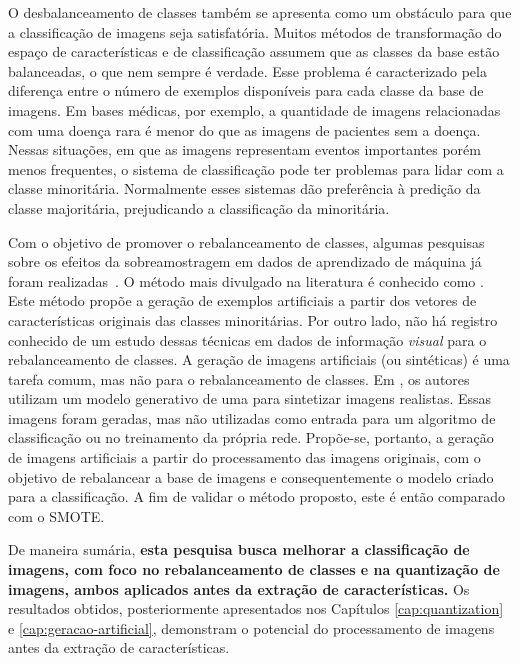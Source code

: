 O desbalanceamento de classes também se apresenta como um obstáculo para que a classificação de imagens seja satisfatória. Muitos métodos de transformação do espaço de características e de classificação assumem que as classes da base estão balanceadas, o que nem sempre é verdade. Esse problema é caracterizado pela diferença entre o número de exemplos disponíveis para cada classe da base de imagens. Em bases médicas, por exemplo, a quantidade de imagens relacionadas com uma doença rara é menor do que as imagens de pacientes sem a doença. Nessas situações, em que as imagens representam eventos importantes porém menos frequentes, o sistema de classificação pode ter problemas para lidar com a classe minoritária. Normalmente esses sistemas dão preferência à predição da classe majoritária, prejudicando a classificação da minoritária.

Com o objetivo de promover o rebalanceamento de classes, algumas pesquisas sobre os efeitos da sobreamostragem em dados de aprendizado de máquina já foram realizadas~\cite{Kuncheva2004,Chawla2002}. O método mais divulgado na literatura é conhecido como . Este método propõe a geração de exemplos artificiais a partir dos vetores de características originais das classes minoritárias. Por outro lado, não há registro conhecido de um estudo dessas técnicas em dados de informação \emph{visual} para o rebalanceamento de classes. A geração de imagens artificiais (ou sintéticas) é uma tarefa comum, mas não para o rebalanceamento de classes. Em , os autores utilizam um modelo generativo de uma  para sintetizar imagens realistas. Essas imagens foram geradas, mas não utilizadas como entrada para um algoritmo de classificação ou no treinamento da própria rede. Propõe-se, portanto, a geração de imagens artificiais a partir do processamento das imagens originais, com o objetivo de rebalancear a base de imagens e consequentemente o modelo criado para a classificação. A fim de validar o método proposto, este é então comparado com o SMOTE.

De maneira sumária, \textbf{esta pesquisa busca melhorar a classificação de imagens, com foco no rebalanceamento de classes e na quantização de imagens, ambos aplicados antes da extração de características.} Os resultados obtidos, posteriormente apresentados nos Capítulos \ref{cap:quantization} e \ref{cap:geracao-artificial}, demonstram o potencial do processamento de imagens antes da extração de características.

